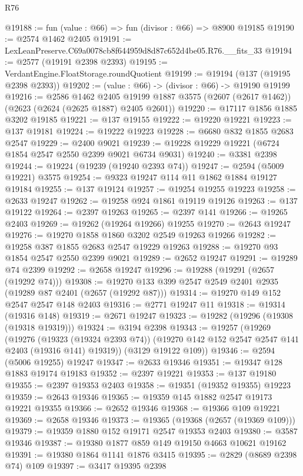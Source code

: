\begin{lexlean}{R76}
\begin{coremodule}
@19188 := fun (value : @66) => fun (divisor : @66) => @8900 @19185
@19190 := @2574 @1462 @2405
@19191 := LexLeanPreserve.C69a0078cb8f644959d8d87c652d4be05.R76.__fits_33
@19194 := @2577 (@19191 @2398 @2393)
@19195 := VerdantEngine.FloatStorage.roundQuotient
@19199 := @19194 (@137 (@19195 @2398 @2393))
@19202 := (value : @66) -> (divisor : @66) -> @19190 @19199
@19216 := @2586
    @1462
    @2405
    @19199
    @1887
    @3575
    (@2607 (@2617 @1462))
    (@2623 (@2624 (@2625 @1887) @2405 @2601))
@19220 := @17117 @1856 @1885 @3202 @19185
@19221 := @137 @19155
@19222 := @19220 @19221
@19223 := @137 @19181
@19224 := @19222 @19223
@19228 := @6680 @832 @1855 @2683 @2547
@19229 := @2400 @9021
@19239 := @19228 @19229 @19221 (@6724 @1854 @2547 @2550 @2399 @9021 @6734 @9031)
@19240 := @3381 @2398
@19244 := @19224 (@19239 (@19240 @2393 @74))
@19247 := @2594 (@5009 @19221) @3575
@19254 := @9323 @19247 @114 @11 @1862 @1884 @19127 @19184
@19255 := @137 @19124
@19257 := @19254 @19255 @19223
@19258 := @2633 @19247
@19262 := @19258 @924 @1861 @19119 @19126
@19263 := @137 @19122
@19264 := @2397 @19263
@19265 := @2397 @141
@19266 := @19265 @2403
@19269 := @19262 (@19264 @19266) @19255
@19270 := @2643 @19247
@19276 := @19270 @1858 @1860 @3202 @2549 @19263 @19266
@19282 := @19258 @387 @1855 @2683 @2547 @19229 @19263
@19288 := @19270 @93 @1854 @2547 @2550 @2399 @9021
@19289 := @2652 @19247
@19291 := @19289 @74 @2399
@19292 := @2658 @19247
@19296 := @19288 (@19291 (@2657 (@19292 @74)))
@19308 := @19270 @133 @399 @2547 @2549 @2401 @2935 (@19289 @87 @2401 (@2657 (@19292 @87)))
@19314 := @19270 @149 @152 @2547 @2547 @148 @2403
@19316 := @2771 @19247 @11
@19318 := @19314 (@19316 @148)
@19319 := @2671 @19247
@19323 := @19282 (@19296 (@19308 (@19318 @19319)))
@19324 := @3194 @2398
@19343 := @19257
    (@19269
      (@19276
        (@19323 (@19324 @2393 @74))
        (@19270 @142 @152 @2547 @2547 @141 @2403 (@19316 @141) @19319))
      (@3129 @19122 @109))
@19346 := @2594 (@5006 @19255) @19247
@19347 := @2633 @19346
@19351 := @19347 @128 @1883 @19174 @19183
@19352 := @2397 @19221
@19353 := @137 @19180
@19355 := @2397 @19353 @2403
@19358 := @19351 (@19352 @19355) @19223
@19359 := @2643 @19346
@19365 := @19359 @145 @1882 @2547 @19173 @19221 @19355
@19366 := @2652 @19346
@19368 := @19366 @109 @19221
@19369 := @2658 @19346
@19373 := @19365 (@19368 (@2657 (@19369 @109)))
@19379 := @19359 @1880 @152 @19171 @2547 @19353 @2403
@19380 := @3587 @19346
@19387 := @19380 @1877 @859 @149 @19150 @4663 @10621 @19162
@19391 := @19380 @1864 @1141 @1876 @3415
@19395 := @2829 (@8689 @2398 @74) @109
@19397 := @3417 @19395 @2398

\end{coremodule}
\end{lexlean}
